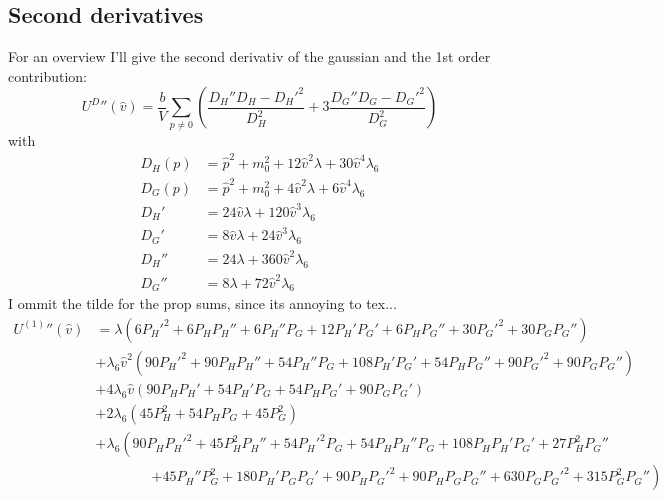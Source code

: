 \subsection*{Second derivatives}
For an overview I'll give the second derivativ of the gaussian and the 1st order contribution:
\begin{equation}\label{eq:CEP_improved_inBrokenPhase_BosDet_deriv_2nd}
	{U^D}''(\hat v) = \frac{b}{V} \sum\limits_{p\neq0} \left(
					\frac{D_H'' D_H - D_H'^2}{D_H^2} + 3 \frac{D_G'' D_G - D_G'^2}{D_G^2}
					\right)
\end{equation}
with
\begin{align}
 \label{eq:CEP_improved_inBrokenPhase_D_H}
	D_H(p) & = \hat p^2 + m_0^2 + 12 \hat v^2 \lambda + 30 \hat v^4 \lambda_6  \\
 \label{eq:CEP_improved_inBrokenPhase_D_G}
	D_G(p) & = \hat p^2 + m_0^2 + 4 \hat v^2 \lambda + 6 \hat v^4 \lambda_6 \\
 \label{eq:CEP_improved_inBrokenPhase_D_H_p}
	D_H' & = 24 \hat v \lambda + 120 \hat v^3 \lambda_6  \\
 \label{eq:CEP_improved_inBrokenPhase_D_G_p}
	D_G' & = 8 \hat v \lambda + 24 \hat v^3 \lambda_6 \\
 \label{eq:CEP_improved_inBrokenPhase_D_H_pp}
	D_H'' & = 24 \lambda + 360 \hat v^2 \lambda_6  \\
 \label{eq:CEP_improved_inBrokenPhase_D_G_pp}
	D_G'' & = 8 \lambda + 72 \hat v^2 \lambda_6 
\end{align}
I ommit the tilde for the prop sums, since its annoying to tex...
\begin{align}
 \label{eq:CEP_improved_inBrokenPhase_1st_deriv_2nd}
 {U^{(1)}}''(\hat v) & = \lambda \left( 6 P_H'^2   +   6 P_H P_H''   +  6 P_H'' P_G   +   12 P_H' P_G'   +   6 P_H P_G''   +   30 P_G'^2   +   30P_G P_G''\right) 
		\nonumber \\
		               & + \lambda_6 \hat v^2 \left(
		                    90 P_H'^2   +   90 P_H P_H''   +  54 P_H'' P_G   +   108 P_H' P_G'   +   54 P_H P_G''   +   90 P_G'^2   +   90P_G P_G'' \right)
		\nonumber \\
		               & + 4 \lambda_6 \hat v \left(
		                90 P_H P_H'   +   54 P_H' P_G   +   54 P_H P_G'   +   90 P_G P_G' \right) 
		\nonumber \\
		               & + 2 \lambda_6 \left( 45 P_H^2   +   54 P_H P_G   +   45 P_G^2 \right)
		\nonumber \\
		               & + \lambda_6 \left(
		                90 P_H P_H'^2   +   45 P_H^2 P_H''   +   54 P_H'^2 P_G   +   54 P_H P_H'' P_G   +   108 P_H P_H' P_G'   +   27 P_H^2 P_G'' \right. 
		                 \nonumber \\
		                & \qquad \qquad \left. 
		                +   45 P_H'' P_G^2   +   180 P_H' P_G P_G'   +   90 P_H P_G'^2   +   90 P_HP_GP_G''   +   630 P_G P_G'^2   +   315 P_G^2 P_G'' \right)
\end{align}





